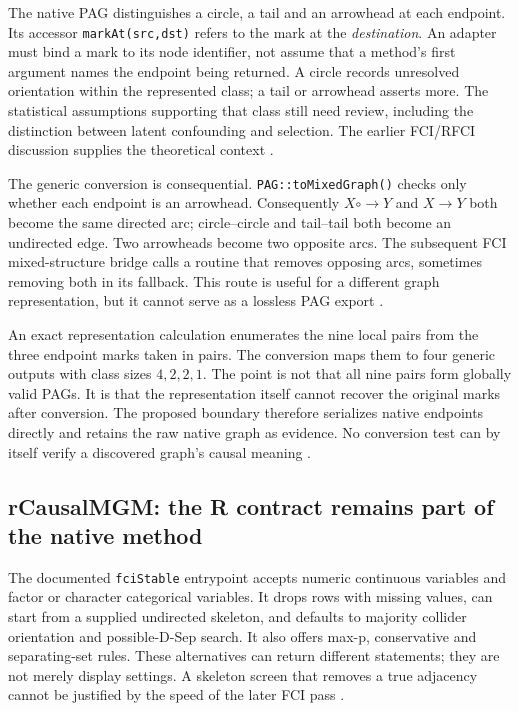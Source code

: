 The native PAG distinguishes a circle, a tail and an arrowhead at each
endpoint. Its accessor \texttt{markAt(src,dst)} refers to the mark at the
\emph{destination}. An adapter must bind a mark to its node identifier, not
assume that a method's first argument names the endpoint being returned. A
circle records unresolved orientation within the represented class; a tail
or arrowhead asserts more. The statistical assumptions supporting that class
still need review, including the distinction between latent confounding and
selection. The earlier FCI/RFCI discussion supplies the theoretical context
\citep{exec13_latentr_colombo2012}.

The generic conversion is consequential. \texttt{PAG::toMixedGraph()} checks
only whether each endpoint is an arrowhead. Consequently $X\mathbin{\circ\!\to}Y$
and $X\to Y$ both become the same directed arc; circle--circle and tail--tail
both become an undirected edge. Two arrowheads become two opposite arcs.
The subsequent FCI mixed-structure bridge calls a routine that removes
opposing arcs, sometimes removing both in its fallback. This route is useful
for a different graph representation, but it cannot serve as a lossless PAG
export \citep{exec14_native_agrum}.

An exact representation calculation enumerates the nine local pairs from
the three endpoint marks taken in pairs. The conversion maps them to
four generic outputs with class sizes $4,2,2,1$. The point is not that all nine
pairs form globally valid PAGs. It is that the representation itself cannot
recover the original marks after conversion. The proposed boundary therefore
serializes native endpoints directly and retains the raw native graph as
evidence. No conversion test can by itself verify a discovered graph's causal
meaning \citep{exec14_native_oracle}.

\subsection{rCausalMGM: the R contract remains part of the native method}

The documented \texttt{fciStable} entrypoint accepts numeric continuous
variables and factor or character categorical variables. It drops rows with
missing values, can start from a supplied undirected skeleton, and defaults
to majority collider orientation and possible-D-Sep search. It also offers
max-p, conservative and separating-set rules. These alternatives can return
different statements; they are not merely display settings. A skeleton
screen that removes a true adjacency cannot be justified by the speed of the
later FCI pass \citep{exec14_native_rcmgm}.

